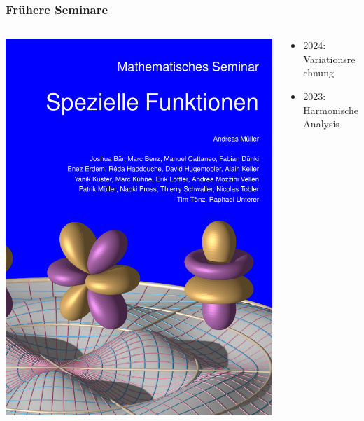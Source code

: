 %
%
%
\bgroup
\begin{frame}[t]
\setlength{\abovedisplayskip}{5pt}
\setlength{\belowdisplayskip}{5pt}
\frametitle{Frühere Seminare}
\vspace{-15pt}
\begin{columns}[t,onlytextwidth]
\begin{column}{0.44\textwidth}
\begin{center}
\includegraphics[width=\textwidth]{../slides/0/front.pdf}
\end{center}
\end{column}
\begin{column}{0.52\textwidth}
\begin{itemize}
\item {\color{gray}2024: Variationsrechnung}
\item {\color{gray}2023: Harmonische Analysis}

\end{itemize}
\end{column}
\end{columns}
\end{frame}
